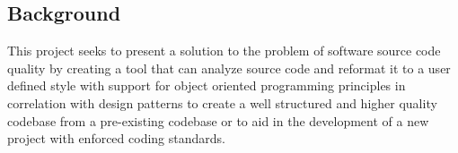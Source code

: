 \subsection{Background}
This project seeks to present a solution to the problem of software source code quality by creating a tool that can analyze source code and reformat it to a user defined style with support for object oriented programming principles in correlation with design patterns to create a well structured and higher quality codebase from a pre-existing codebase or to aid in the development of a new project with enforced coding standards.

